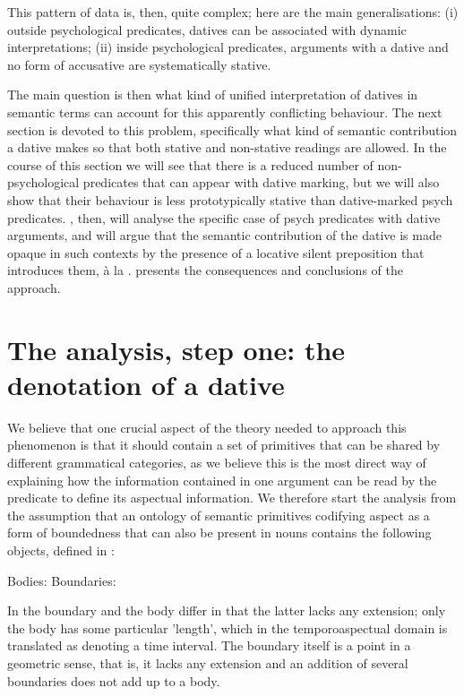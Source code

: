 \documentclass[output=paper,colorlinks,citecolor=brown,nonflat]{./langscibook}
\begin{document}
This pattern of data is, then, quite complex; here are the main generalisations: (i) outside psychological predicates, datives can be associated with dynamic interpretations; (ii) inside psychological predicates, arguments with a dative and no form of accusative are systematically stative.

The main question is then what kind of unified interpretation of datives in semantic terms can account for this apparently conflicting behaviour. The next section is devoted to this problem, specifically what kind of semantic contribution a dative makes so that both stative and non-stative readings are allowed. In the course of this section we will see that there is a reduced number of non-psychological predicates that can appear with dative marking, but we will also show that their behaviour is less prototypically stative than dative-marked psych predicates. , then, will analyse the specific case of psych predicates with dative arguments, and will argue that the semantic contribution of the dative is made opaque in such contexts by the presence of a locative silent preposition that introduces them, à la \citet{Landau2010}.  presents the consequences and conclusions of the approach.

\section{The analysis, step one: the denotation of a dative}\label{sec:fabregas:2}

We believe that one crucial aspect of the theory needed to approach this phenomenon is that it should contain a set of primitives that can be shared by different grammatical categories, as we believe this is the most direct way of explaining how the information contained in one argument can be read by the predicate to define its aspectual information. We therefore start the analysis from the assumption that an ontology of semantic primitives codifying aspect as a form of boundedness that can also be present in nouns contains the following objects, defined in \citet{Piñón1997}:

\ea%
    \label{ex:fabregas:13}
    \ea\label{ex:fabregas:13a}
    Bodies: {\midline}
    \ex\label{ex:fabregas:13b}
    Boundaries: {\textbar}
    \z
\z

In \citet{Piñón1997} the boundary and the body differ in that the latter lacks any extension; only the body has some particular 'length', which in the temporoaspectual domain is translated as denoting a time interval. The boundary itself is a point in a geometric sense, that is, it lacks any extension and an addition of several boundaries does not add up to a body.
\end{document}
